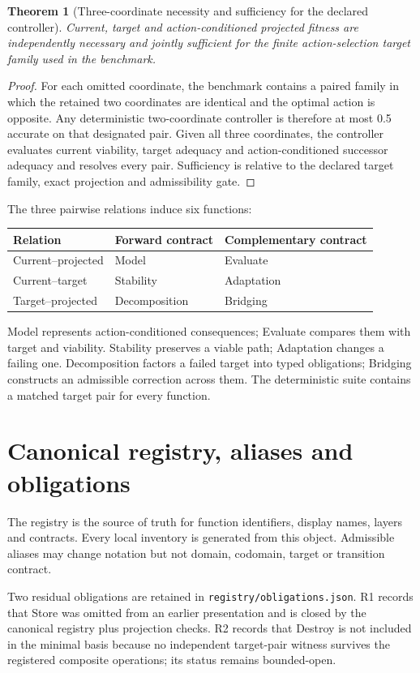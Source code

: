 \documentclass[10pt]{article}
\newtheorem{theorem}{Theorem}
\begin{document}
\begin{theorem}[Three-coordinate necessity and sufficiency for the declared controller]
Current, target and action-conditioned projected fitness are independently necessary and jointly sufficient for the finite action-selection target family used in the benchmark.
\end{theorem}
\begin{proof}
For each omitted coordinate, the benchmark contains a paired family in which the retained two coordinates are identical and the optimal action is opposite. Any deterministic two-coordinate controller is therefore at most 0.5 accurate on that designated pair. Given all three coordinates, the controller evaluates current viability, target adequacy and action-conditioned successor adequacy and resolves every pair. Sufficiency is relative to the declared target family, exact projection and admissibility gate.
\end{proof}

The three pairwise relations induce six functions:
\begin{center}
\begin{tabular}{lll}
\toprule Relation & Forward contract & Complementary contract \\
\midrule
Current--projected & Model & Evaluate \\
Current--target & Stability & Adaptation \\
Target--projected & Decomposition & Bridging \\
\bottomrule
\end{tabular}
\end{center}
Model represents action-conditioned consequences; Evaluate compares them with target and viability. Stability preserves a viable path; Adaptation changes a failing one. Decomposition factors a failed target into typed obligations; Bridging constructs an admissible correction across them. The deterministic suite contains a matched target pair for every function.

\section{Canonical registry, aliases and obligations}
The registry is the source of truth for function identifiers, display names, layers and contracts. Every local inventory is generated from this object. Admissible aliases may change notation but not domain, codomain, target or transition contract.

Two residual obligations are retained in \texttt{registry/obligations.json}. R1 records that Store was omitted from an earlier presentation and is closed by the canonical registry plus projection checks. R2 records that Destroy is not included in the minimal basis because no independent target-pair witness survives the registered composite operations; its status remains bounded-open.
\end{document}
